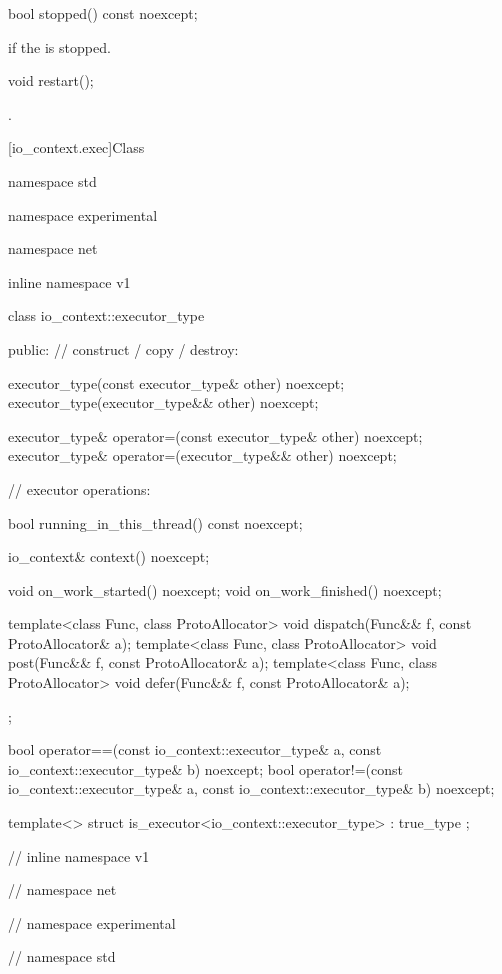 \begin{itemdecl}
bool stopped() const noexcept;
\end{itemdecl}

\begin{itemdescr}
\pnum
\returns {} if the  is stopped.
\end{itemdescr}

\begin{itemdecl}
void restart();
\end{itemdecl}

\begin{itemdescr}
\pnum
\postconditions {}.
\end{itemdescr}




[io_context.exec]{Class }

\begin{codeblock}
namespace std {
namespace experimental {
namespace net {
inline namespace v1 {

  class io_context::executor_type
  {
  public:
    // construct / copy / destroy:

    executor_type(const executor_type& other) noexcept;
    executor_type(executor_type&& other) noexcept;

    executor_type& operator=(const executor_type& other) noexcept;
    executor_type& operator=(executor_type&& other) noexcept;

    // executor operations:

    bool running_in_this_thread() const noexcept;

    io_context& context() noexcept;

    void on_work_started() noexcept;
    void on_work_finished() noexcept;

    template<class Func, class ProtoAllocator>
      void dispatch(Func&& f, const ProtoAllocator& a);
    template<class Func, class ProtoAllocator>
      void post(Func&& f, const ProtoAllocator& a);
    template<class Func, class ProtoAllocator>
      void defer(Func&& f, const ProtoAllocator& a);
  };

  bool operator==(const io_context::executor_type& a,
                  const io_context::executor_type& b) noexcept;
  bool operator!=(const io_context::executor_type& a,
                  const io_context::executor_type& b) noexcept;

  template<> struct is_executor<io_context::executor_type> : true_type {};

} // inline namespace v1
} // namespace net
} // namespace experimental
} // namespace std
\end{codeblock}

